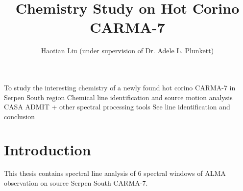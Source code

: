 \documentclass{aa}
\begin{document}
 


   \title{Chemistry Study on Hot Corino CARMA-7}



   \author{Haotian Liu (under supervision of Dr. Adele L. Plunkett)}





 
  \abstract
   {To study the interesting chemistry of a newly found hot corino CARMA-7 in Serpen South region}
   {Chemical line identification and source motion analysis}
   {CASA ADMIT + other spectral processing tools}
   {See line identification and conclusion}
   {}


   \maketitle
%

\section{Introduction}

    This thesis contains spectral line analysis of 6 spectral windows of ALMA observation on source Serpen South CARMA-7.

\end{document}
